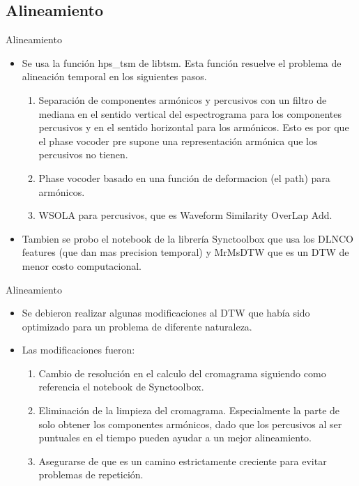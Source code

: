 \documentclass{beamer}
\begin{document}
\subsection{Alineamiento}
\begin{frame}{Alineamiento}
\begin{itemize}
    \item Se usa la función hps\_tsm de libtsm. Esta función resuelve el problema de alineación temporal en los siguientes pasos.
    \begin{enumerate}
        \item Separación de componentes armónicos y percusivos con un filtro de mediana en el sentido vertical del espectrograma para los componentes percusivos y en el sentido horizontal para los armónicos. Esto es por que el phase vocoder pre supone una representación armónica que los percusivos no tienen.
        \item Phase vocoder basado en una función de deformacion (el path) para armónicos.
        \item WSOLA para percusivos, que es Waveform Similarity OverLap Add.
    \end{enumerate}
    \item Tambien se probo el notebook de la librería Synctoolbox que usa los DLNCO features (que dan mas precision temporal) y MrMsDTW que es un DTW de menor costo computacional. 
\end{itemize}
\end{frame}
\begin{frame}{Alineamiento}
\begin{itemize}
    \item Se debieron realizar algunas modificaciones al DTW que había sido optimizado para un problema de diferente naturaleza.
    \item Las modificaciones fueron:
    \begin{enumerate}
        \item Cambio de resolución en el calculo del cromagrama siguiendo como referencia el notebook de Synctoolbox.
        \item Eliminación de la limpieza del cromagrama. Especialmente la parte de solo obtener los componentes armónicos, dado que los percusivos al ser puntuales en el tiempo pueden ayudar a un mejor alineamiento.
        \item Asegurarse de que es un camino estrictamente creciente para evitar problemas de repetición.
    \end{enumerate}
\end{itemize}
\end{frame}
\end{document}

